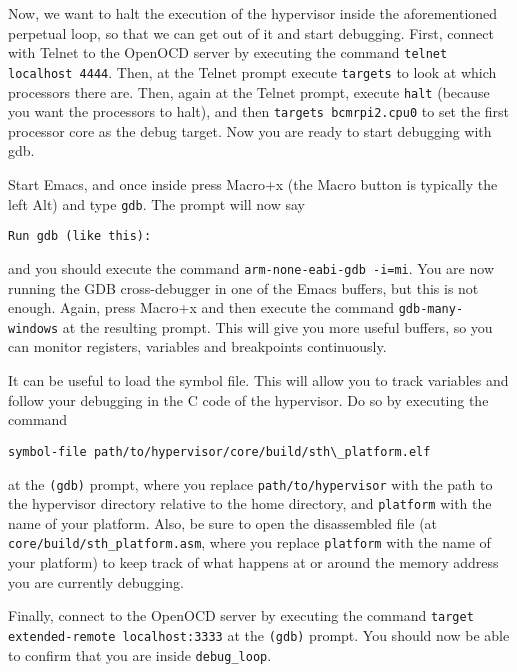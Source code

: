 \documentclass[a4paper,11pt,reqno]{amsart}
\begin{document}
Now, we want to halt the execution of the hypervisor inside the aforementioned perpetual loop, so that we can get out of it and start debugging. First, connect with Telnet to the OpenOCD server by executing the command \texttt{telnet localhost 4444}. Then, at the Telnet prompt execute \texttt{targets} to look at which processors there are. Then, again at the Telnet prompt, execute \texttt{halt} (because you want the processors to halt), and then \texttt{targets bcmrpi2.cpu0} to set the first processor core as the debug target. Now you are ready to start debugging with gdb.

Start Emacs, and once inside press Macro+x (the Macro button is typically the left Alt) and type \texttt{gdb}. The prompt will now say

\begin{verbatim}
Run gdb (like this):
\end{verbatim}

and you should execute the command \texttt{arm-none-eabi-gdb -i=mi}. You are now running the GDB cross-debugger in one of the Emacs buffers, but this is not enough. Again, press Macro+x and then execute the command \texttt{gdb-many-windows} at the resulting prompt. This will give you more useful buffers, so you can monitor registers, variables and breakpoints continuously.

It can be useful to load the symbol file. This will allow you to track variables and follow your debugging in the C code of the hypervisor. Do so by executing the command

\begin{verbatim}
symbol-file path/to/hypervisor/core/build/sth\_platform.elf
\end{verbatim}

at the \texttt{(gdb)} prompt, where you replace \texttt{path/to/hypervisor} with the path to the hypervisor directory relative to the home directory, and \texttt{platform} with the name of your platform. Also, be sure to open the disassembled file (at \texttt{core/build/sth\_platform.asm}, where you replace \texttt{platform} with the name of your platform) to keep track of what happens at or around the memory address you are currently debugging.

Finally, connect to the OpenOCD server by executing the command \texttt{target extended-remote localhost:3333} at the \texttt{(gdb)} prompt. You should now be able to confirm that you are inside \texttt{debug\_loop}. 
\end{document}
